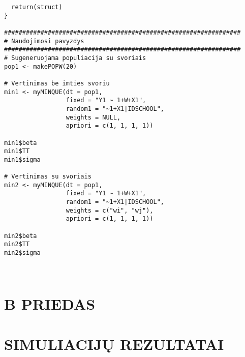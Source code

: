 \documentclass[11pt,a4paper]{article}
\begin{document}
\begin{appendix}
\begin{footnotesize}
\begin{verbatim}
  return(struct)
}

#################################################################
# Naudojimosi pavyzdys
#################################################################
# Sugeneruojama populiacija su svoriais
pop1 <- makePOPW(20)

# Vertinimas be imties svoriu
min1 <- myMINQUE(dt = pop1,
                 fixed = "Y1 ~ 1+W+X1",
                 random1 = "~1+X1|IDSCHOOL",
                 weights = NULL,
                 apriori = c(1, 1, 1, 1))

min1$beta
min1$TT
min1$sigma

# Vertinimas su svoriais
min2 <- myMINQUE(dt = pop1,
                 fixed = "Y1 ~ 1+W+X1",
                 random1 = "~1+X1|IDSCHOOL",
                 weights = c("wi", "wj"),
                 apriori = c(1, 1, 1, 1))

min2$beta
min2$TT
min2$sigma



\end{verbatim}
\end{footnotesize}
\end{appendix}


 \hypertarget{appendixb}{\section*{B PRIEDAS}}
\section*{SIMULIACIJŲ REZULTATAI}\label{sec:lenteles}
\end{document}
